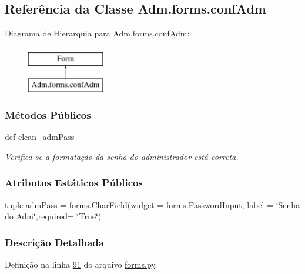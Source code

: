 \hypertarget{classAdm_1_1forms_1_1confAdm}{\subsection{Referência da Classe Adm.\-forms.\-conf\-Adm}
\label{classAdm_1_1forms_1_1confAdm}
}
Diagrama de Hierarquia para Adm.\-forms.\-conf\-Adm\-:\begin{figure}[H]
\begin{center}
\leavevmode
\includegraphics[height=2.000000cm]{d2/db2/classAdm_1_1forms_1_1confAdm}
\end{center}
\end{figure}
\subsubsection*{Métodos Públicos}
\begin{DoxyCompactItemize}
\item 
def \hyperlink{classAdm_1_1forms_1_1confAdm_ab5a399d0326bd135a123c5aa7a49cc29}{clean\-\_\-adm\-Pass}
\begin{DoxyCompactList}\small\item\em Verifica se a formatação da senha do administrador está correta. \end{DoxyCompactList}\end{DoxyCompactItemize}
\subsubsection*{Atributos Estáticos Públicos}
\begin{DoxyCompactItemize}
\item 
tuple \hyperlink{classAdm_1_1forms_1_1confAdm_a30fc9256d1b7a6ca4ac453111c6944b9}{adm\-Pass} = forms.\-Char\-Field(widget = forms.\-Password\-Input, label = \char`\"{}Senha do Adm\char`\"{},required= \char`\"{}True\char`\"{})
\end{DoxyCompactItemize}


\subsubsection{Descrição Detalhada}


Definição na linha \hyperlink{Adm_2forms_8py_source_l00091}{91} do arquivo \hyperlink{Adm_2forms_8py_source}{forms.\-py}.



